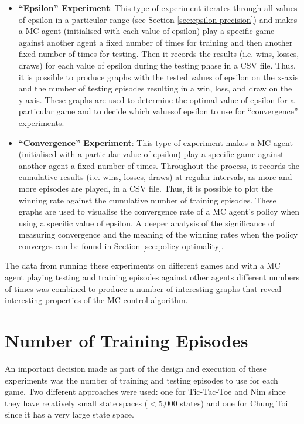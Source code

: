 \documentclass[11pt,a4paper]{report}
\begin{document}
\begin{itemize}

	\item \textbf{``Epsilon'' Experiment}: This type of experiment iterates through all values of epsilon in a particular range (see Section \ref{sec:epsilon-precision}) and makes a MC agent (initialised with each value of epsilon) play a specific game against another agent a fixed number of times for training and then another fixed number of times for testing. Then it records the results (i.e. wins, losses, draws) for each value of epsilon during the testing phase in a CSV file. Thus, it is possible to produce graphs with the tested values of epsilon on the x-axis and the number of testing episodes resulting in a win, loss, and draw on the y-axis. These graphs are used to determine the optimal value of epsilon for a particular game and to decide which valuesof epsilon to use for ``convergence'' experiments.

	\item \textbf{``Convergence'' Experiment}: This type of experiment makes a MC agent (initialised with a particular value of epsilon) play a specific game against another agent a fixed number of times. Throughout the process, it records the cumulative results (i.e. wins, losses, draws) at regular intervals, as more and more episodes are played, in a CSV file. Thus, it is possible to plot the winning rate against the cumulative number of training episodes. These graphs are used to visualise the convergence rate of a MC agent's policy when using a specific value of epsilon. A deeper analysis of the significance of measuring convergence and the meaning of the winning rates when the policy converges can be found in Section \ref{sec:policy-optimality}.

\end{itemize}

The data from running these experiments on different games and with a MC agent playing testing and training episodes against other agents different numbers of times was combined to produce a number of interesting graphs that reveal interesting properties of the MC control algorithm.


\section{Number of Training Episodes}

An important decision made as part of the design and execution of these experiments was the number of training and testing episodes to use for each game. Two different approaches were used: one for Tic-Tac-Toe and Nim since they have relatively small state spaces ($<$5,000 states) and one for Chung Toi since it has a very large state space.
\end{document}
